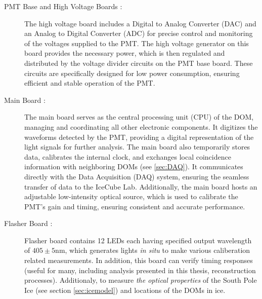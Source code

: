 \begin{description}
    \item[PMT Base and High Voltage Boards :] The high voltage board includes a Digital to Analog Converter (DAC) and an Analog to Digital Converter (ADC) for precise control and monitoring of the voltages supplied to the PMT. The high voltage generator on this board provides the necessary power, which is then regulated and distributed by the voltage divider circuits on the PMT base board. These circuits are specifically designed for low power consumption, ensuring efficient and stable operation of the PMT.
    
    \item[Main Board :] The main board serves as the central processing unit (CPU) of the DOM, managing and coordinating all other electronic components. It digitizes the waveforms detected by the PMT, providing a digital representation of the light signals for further analysis. The main board also temporarily stores data, calibrates the internal clock, and exchanges local coincidence information with neighboring DOMs (see \ref{sec:DAQ}). It communicates directly with the Data Acquisition (DAQ) system, ensuring the seamless transfer of data to the IceCube Lab. Additionally, the main board hosts an adjustable low-intensity optical source, which is used to calibrate the PMT's gain and timing, ensuring consistent and accurate performance.
    
    \item[Flasher Board :] Flasher board contains 12 LEDs each having specified output wavelength of $405\pm5 \mathrm{nm}$,
        which generates lights \emph{in situ} to make various caliberation related measurements. In addition, this board can verify timing responses (useful for many, including analysis presented in this thesis, reconstruction processes). Additionaly, to measure \emph{the optical properties} of the South Pole Ice (see section \ref{sec:icemodel}) and locations of the DOMs in ice.
    
\end{description}

